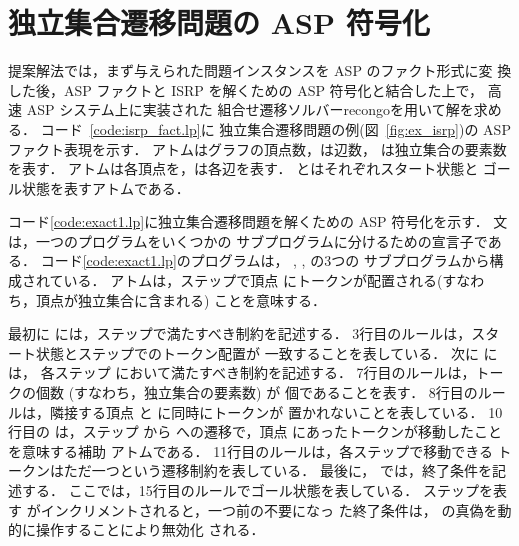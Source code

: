 \section{独立集合遷移問題の ASP 符号化}\label{sec:proposal}

 

 

提案解法では，まず与えられた問題インスタンスを ASP のファクト形式に変
換した後，ASP ファクトと ISRP を解くための ASP 符号化と結合した上で，
高速 ASP システム{\clingo}上に実装された
組合せ遷移ソルバー\textsf{recongo}を用いて解を求める．
%
コード~\ref{code:isrp_fact.lp}に
独立集合遷移問題の例(図~\ref{fig:ex_isrp})の ASP ファクト表現を示す．
%
アトムはグラフの頂点数，は辺数，
は独立集合の要素数を表す．
アトムは各頂点を，は各辺を表す．
とはそれぞれスタート状態と
ゴール状態を表すアトムである．

コード\ref{code:exact1.lp}に独立集合遷移問題を解くための ASP 符号化を示す．
文は，一つのプログラムをいくつかの
サブプログラムに分けるための宣言子である．
コード\ref{code:exact1.lp}のプログラムは，
, , の3つの
サブプログラムから構成されている．
アトムは，ステップで頂点
にトークンが配置される(すなわち，頂点が独立集合に含まれる)
ことを意味する．

最初に  には，ステップで満たすべき制約を記述する．
3行目のルールは，スタート状態とステップでのトークン配置が
一致することを表している．
次に  には，
各ステップ  において満たすべき制約を記述する．
7行目のルールは，トークの個数 (すなわち，独立集合の要素数) が 
個であることを表す．
8行目のルールは，隣接する頂点  と  に同時にトークンが
置かれないことを表している．
10行目の は，ステップ  から 
への遷移で，頂点  にあったトークンが移動したことを意味する補助
アトムである．
11行目のルールは，各ステップで移動できる
トークンはただ一つという遷移制約を表している．
最後に， では，終了条件を記述する．
ここでは，15行目のルールでゴール状態を表している．
ステップを表す  がインクリメントされると，一つ前の不要になっ
た終了条件は， の真偽を動的に操作することにより無効化
される．

